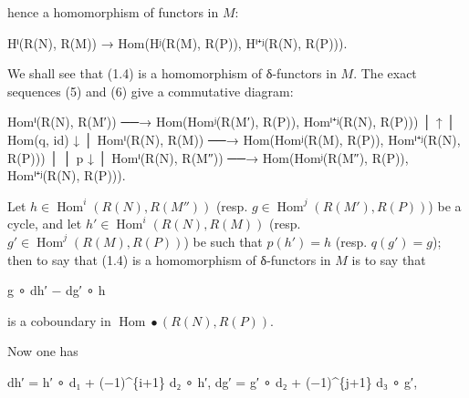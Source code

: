 \documentclass[
]{article}
\newenvironment{Shaded}{}{}
\newcommand{\NormalTok}[1]{#1}
\begin{document}
hence a homomorphism of functors in \(M\):

\begin{Shaded}
\begin{Highlighting}[]
\NormalTok{Hⁱ(R(N), R(M)) → Hom(Hʲ(R(M), R(P)), Hⁱ⁺ʲ(R(N), R(P))).}
\end{Highlighting}
\end{Shaded}

We shall see that (1.4) is a homomorphism of δ-functors in \(M\). The
exact sequences (5) and (6) give a commutative diagram:

\begin{Shaded}
\begin{Highlighting}[]
\NormalTok{Homⁱ(R(N), R(M′))   ──→   Hom(Homʲ(R(M′), R(P)), Homⁱ⁺ʲ(R(N), R(P)))}
\NormalTok{       │                                       ↑}
\NormalTok{       │                                  Hom(q, id)}
\NormalTok{       ↓                                       │}
\NormalTok{Homⁱ(R(N), R(M))    ──→   Hom(Homʲ(R(M), R(P)), Homⁱ⁺ʲ(R(N), R(P)))}
\NormalTok{       │}
\NormalTok{       │ p}
\NormalTok{       ↓                                       │}
\NormalTok{Homⁱ(R(N), R(M″))   ──→   Hom(Homʲ(R(M″), R(P)), Homⁱ⁺ʲ(R(N), R(P))).}
\end{Highlighting}
\end{Shaded}

Let \(h \in \operatorname{Hom}^{i}(R(N), R(M''))\) (resp.
\(g \in \operatorname{Hom}^{j}(R(M'), R(P))\)) be a cycle, and let
\(h' \in \operatorname{Hom}^{i}(R(N), R(M))\) (resp.
\(g' \in \operatorname{Hom}^{j}(R(M), R(P))\)) be such that
\(p(h') = h\) (resp. \(q(g') = g\)); then to say that (1.4) is a
homomorphism of δ-functors in \(M\) is to say that

\begin{Shaded}
\begin{Highlighting}[]
\NormalTok{g ∘ dh′ − dg′ ∘ h}
\end{Highlighting}
\end{Shaded}

is a coboundary in \(\operatorname{Hom}\bullet(R(N), R(P))\).

Now one has

\begin{Shaded}
\begin{Highlighting}[]
\NormalTok{dh′ = h′ ∘ d₁ + (−1)\^{}\{i+1\} d₂ ∘ h′,}
\NormalTok{dg′ = g′ ∘ d₂ + (−1)\^{}\{j+1\} d₃ ∘ g′,}
\end{Highlighting}
\end{Shaded}
\end{document}
